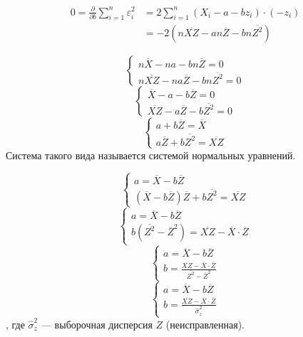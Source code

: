 \begin{align*}
    0 = \frac{\partial}{\partial b} \sum_{i=1}^{n} \varepsilon_i^2
     & = 2 \sum_{i=1}^{n} (X_i - a - b z_i) \cdot ( - z_i)                      \\
     & = - 2 \left(n \overline{XZ} - an \overline{Z} - b n\overline{Z^2}\right)
\end{align*}

\[\begin{cases}
        n \overline{X} - na - bn \overline{Z} = 0 \\
        n \overline{XZ} - na \overline{Z} - bn \overline{Z^2} = 0
    \end{cases}\]
\[\begin{cases}
        \overline{X} - a - b \overline{Z} = 0 \\
        \overline{XZ} - a \overline{Z} - b \overline{Z^2} = 0
    \end{cases}\]
\[\begin{cases}
        a + b \overline{Z} = \overline{X} \\
        a \overline{Z} + b \overline{Z^2} = \overline{XZ}
    \end{cases}\]
Система такого вида называется системой нормальных уравнений.

\[\begin{cases}
        a = \overline{X} - b \overline{Z} \\
        (\overline{X} - b \overline{Z}) \overline{Z} + b \overline{Z^2} = \overline{XZ}
    \end{cases}\]
\[\begin{cases}
        a = \overline{X} - b \overline{Z} \\
        b(\overline{Z^2} - \overline{Z}^2) = \overline{XZ} - \overline{X} \cdot \overline{Z}
    \end{cases}\]
\[\begin{cases}
        a = \overline{X} - b \overline{Z} \\
        b = \frac{ \overline{XZ} - \overline{X} \cdot \overline{Z}}{ \overline{Z^2} - \overline{Z}^2}
    \end{cases}\]
\[\begin{cases}
        a = \overline{X} - b \overline{Z} \\
        b = \frac{ \overline{XZ} - \overline{X} \cdot \overline{Z}}{ \hat{\sigma}_z^2}
    \end{cases}\]
, где \(\hat{\sigma}_z^2\) --- выборочная дисперсия \(Z\) (неисправленная).

